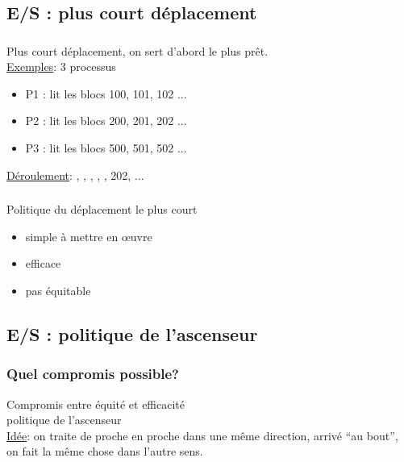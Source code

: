 \subsection{E/S : plus court déplacement}
\begin{frame}
\frametitle{\insertsubsection}
\alert{Plus court déplacement}, on sert d'abord le plus prêt.\\
\vspace{0.5cm}
\underline{Exemples}: 3 processus
\begin{itemize}
\item P1 : lit les blocs 100, 101, 102 ...
\item P2 : lit les blocs 200, 201, 202 ...
\item P3 : lit les blocs 500, 501, 502 ...
\end{itemize}
\pause
\vspace{0.5cm}
\underline{Déroulement}:
, 
, 
, 
, 
, 202, ...
\end{frame}

\begin{frame}
  \frametitle{\insertsubsection}
  \large
  Politique du déplacement le plus court
  \begin{itemize}
  \item \alert{simple} à mettre en \oe{}uvre
  \item \alert{efficace} 
  \item \alert{pas équitable}
  \end{itemize}
  \normalsize
\end{frame}

\subsection{E/S : politique de l’ascenseur}
\begin{frame}
  \frametitle{Quel compromis possible?}
  Compromis entre équité et efficacité\\
   politique de l'\alert{ascenseur}\\
  \vspace{0.5cm}
  \underline{Idée}: on traite de proche en proche dans une même direction, 
  arrivé ``au bout'', on fait la même chose dans l'autre sens.
\end{frame}

